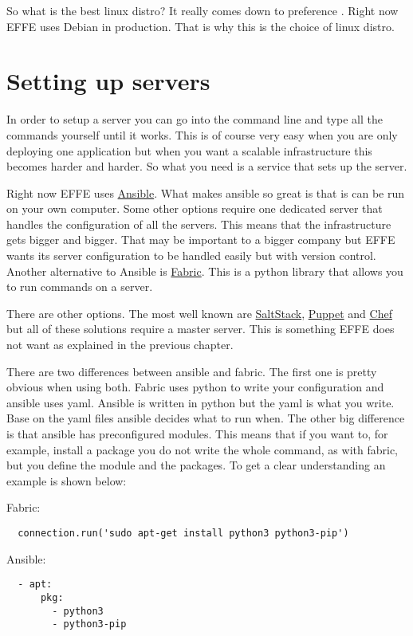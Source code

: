 So what is the best linux distro? It really comes down to preference \cite{bestLinuxDistro}. Right now EFFE uses Debian in production. That is why this is the choice of linux distro.

\section{Setting up servers}

In order to setup a server you can go into the command line and type all the commands yourself until it works. This is of course very easy when you are only deploying one application but when you want a scalable infrastructure this becomes harder and harder. So what you need is a service that sets up the server.

Right now EFFE uses \href{https://www.ansible.com/}{Ansible}. What makes ansible so great is that is can be run on your own computer. Some other options require one dedicated server that handles the configuration of all the servers. This means that the infrastructure gets bigger and bigger. That may be important to a bigger company but EFFE wants its server configuration to be handled easily but with version control. Another alternative to Ansible is \href{http://www.fabfile.org/}{Fabric}. This is a python library that allows you to run commands on a server.

There are other options. The most well known are \href{https://www.saltstack.com/}{SaltStack}, \href{https://puppet.com/}{Puppet} and \href{https://www.chef.io/}{Chef} but all of these solutions require a master server. This is something EFFE does not want as explained in the previous chapter.

There are two differences between ansible and fabric. The first one is pretty obvious when using both. Fabric uses python to write your configuration and ansible uses yaml. Ansible is written in python but the yaml is what you write. Base on the yaml files ansible decides what to run when. The other big difference is that ansible has preconfigured modules. This means that if you want to, for example, install a package you do not write the whole command, as with fabric, but you define the module and the packages. To get a clear understanding an example is shown below:

Fabric:
\begin{verbatim}
  connection.run('sudo apt-get install python3 python3-pip')
\end{verbatim}

Ansible:
\begin{verbatim}
  - apt:
      pkg:
        - python3
        - python3-pip
\end{verbatim}

